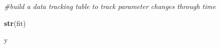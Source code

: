 \documentclass[]{book}
\newenvironment{Shaded}{\begin{snugshade}}{\end{snugshade}}
\newcommand{\KeywordTok}[1]{\textcolor[rgb]{0.13,0.29,0.53}{\textbf{{#1}}}}
\newcommand{\CommentTok}[1]{\textcolor[rgb]{0.56,0.35,0.01}{\textit{{#1}}}}
\newcommand{\NormalTok}[1]{{#1}}
\theoremstyle{definition}
\theoremstyle{definition}
\theoremstyle{definition}
\theoremstyle{remark}
\begin{document}
\begin{Shaded}
\begin{Highlighting}[]
\CommentTok{#build a data tracking table to track parameter changes through time}

\KeywordTok{str}\NormalTok{(fit)}

\NormalTok{y}
\end{Highlighting}
\end{Shaded}


\end{document}
